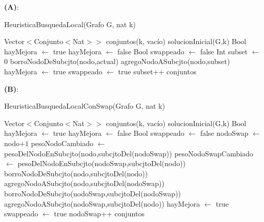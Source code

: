 \textbf{(A)}:
\begin{algorithm}[H]
\begin{algorithmic}[1]
\caption{HeuristicaBusquedaLocal(Grafo G, nat k)}
\STATE Vector$<$Conjunto$<$Nat$>>$ conjuntos(k, vacío)
\STATE solucionInicial(G,k)
\STATE Bool hayMejora $\leftarrow$ true
    \STATE hayMejora $\leftarrow$ false
        \STATE Bool swappeado $\leftarrow$ false
        \STATE Int subset $\leftarrow$ 0
                \STATE borroNodoDeSubcjto(nodo,actual)
                \STATE agregoNodoASubcjto(nodo,subset)
                \STATE hayMejora $\leftarrow$ true
                \STATE swappeado $\leftarrow$ true
            \ENDIF
            \STATE subset++
        \ENDWHILE
    \ENDFOR
\ENDWHILE
\RETURN conjuntos
\end{algorithmic}
\end{algorithm}

\textbf{(B)}:
\begin{algorithm}[H]
\begin{algorithmic}[1]
\caption{HeuristicaBusquedaLocalConSwap(Grafo G, nat k)}
\STATE Vector$<$Conjunto$<$Nat$>>$ conjuntos(k, vacío)
\STATE solucionInicial(G,k)
\STATE Bool hayMejora $\leftarrow$ true
    \STATE hayMejora $\leftarrow$ false
        \STATE Bool swappeado $\leftarrow$ false
        \STATE nodoSwap $\leftarrow$ nodo$+1$
                \STATE pesoNodoCambiado $\leftarrow$ pesoDelNodoEnSubcjto(nodo,subcjtoDel(nodoSwap))
                \STATE pesoNodoSwapCambiado $\leftarrow$ pesoDelNodoEnSubcjto(nodoSwap,subcjtoDel(nodo))
                    \STATE borroNodoDeSubcjto(nodo,subcjtoDel(nodo))
                    \STATE agregoNodoASubcjto(nodo,subcjtoDel(nodoSwap))
                    \STATE borroNodoDeSubcjto(nodoSwap,subcjtoDel(nodoSwap))
                    \STATE agregoNodoASubcjto(nodoSwap,subcjtoDel(nodo))
                    \STATE hayMejora $\leftarrow$ true
                    \STATE swappeado $\leftarrow$ true
                \ENDIF
            \ENDIF
            \STATE nodoSwap++
        \ENDWHILE
    \ENDFOR
\ENDWHILE
\RETURN conjuntos
\end{algorithmic}
\end{algorithm}


